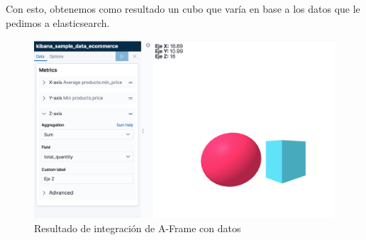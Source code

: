 \documentclass[a4paper, 12pt]{book}
\begin{document}
Con esto, obtenemos como resultado un cubo que varía en base a los datos que le pedimos a elasticsearch.

\begin{figure}[H]
  \centering
  \includegraphics[width=16cm, keepaspectratio]{img/development/box_with_data.png}
  \caption{Resultado de integración de A-Frame con datos}
  \label{fig:boxwithdata}
\end{figure}



\end{document}
